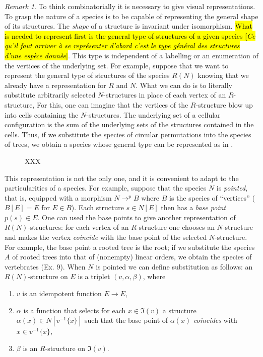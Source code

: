 \documentclass{amsart}
\theoremstyle{definition}
\theoremstyle{remark}
\newtheorem*{rem}{Remark}
\newcommand{\trans}[2]{\hl{#1 [\textit{#2}]}}
\newcommand{\pref}[1]{\prettyref{#1}}
\begin{document}
\begin{rem}
  To think combinatorially it is necessary to give visual
  representations. To grasp the nature of a species is to be capable
  of representing the general shape of its structures. The
  \emph{shape} of a structure is invariant under
  isomorphism. \trans{What is needed to represent first is the general
    type of structures of a given species}{Ce qu'il faut arriver \`a
    se repr\'esenter d'abord c'est le type g\'en\'eral des structures
    d'une esp\`ece donn\`ee}.  This type is independent of a labelling
  or an enumeration of the vertices of the underlying set. For
  example, suppose that we want to represent the general type of
  structures of the species $R(N)$ knowing that we already have a
  representation for $R$ and $N$. What we can do is to literally
  substitute arbitrarily selected $N$-structures in place of each
  vertex of an $R$-structure, For this, one can imagine that the
  vertices of the $R$-structure blow up into cells containing the
  $N$-structures.  The underlying set of a cellular configuration is
  the sum of the underlying sets of the structures contained in the
  cells. Thus, if we substitute the species of circular permutations
  into the species of trees, we obtain a species whose general type
  can be represented as in \pref{fig:tree-of-cycles}.

  \begin{figure}
    \centering
    \caption{XXX}
    \label{fig:tree-of-cycles}
  \end{figure}

This representation is not the only one, and it is convenient to adapt to
the particularities of a species. For example, suppose that the species $N$
is \emph{pointed}, that is, equipped with a morphism $N \to^p B$ where $B$ is the species
of ``vertices'' ($B [E] = E$ for $E \in B$). Each structure $s \in N[E]$ then has
a \emph{base point} $p (s) \in E$. One can used the base points to
give another representation of $R (N)$-structures: for each vertex
of an $R$-structure one chooses an $N$-structure and makes the vertex \emph{coincide}
with the base point of the selected $N$-structure. For example, the base point
a rooted tree is the root; if we substitute the species $A$ of rooted trees
into that of (nonempty) linear orders, we obtain the species of vertebrates
(Ex. 9). When $N$ is pointed we can define substitution as follows: an
$R (N)$-structure on $E$ is a triplet $(v, \alpha, \beta)$, where
\begin{enumerate}
\item $v$ is an idempotent function $E \to E$,
\item $\alpha$ is a function that selects for each $x \in \Im (v)$ a
  structure $\alpha (x) \in N [v^{-1}\{x\}]$ such that the base point
  of $\alpha (x)$ \emph{coincides} with $x \in v^{-1}\{x\}$,
\item $\beta$ is an $R$-structure on $\Im (v)$.
\end{enumerate}
\end{rem}
\end{document}
